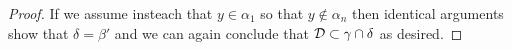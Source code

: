 \documentclass[class=book, crop=false,12 pt]{standalone}
\begin{document}
\begin{proof}
	If we assume insteach that $y\in\alpha_1$ so that $y\not\in \alpha_n$ then identical arguments show that $\delta=\beta'$ and we can again conclude that $\mathcal{D}\subset \gamma\cap \delta$ as desired.

%
%
%
%
%
\end{proof}
\end{document}
